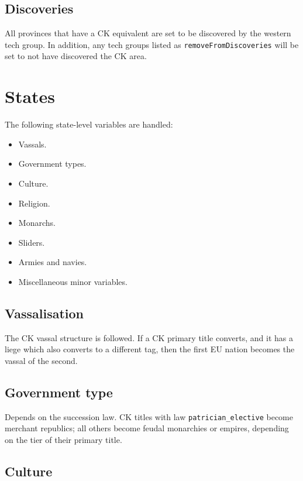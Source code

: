 \documentclass[12pt,ebook,oneside]{book}
\begin{document}
\section{Discoveries}

All provinces that have a CK equivalent are set to be discovered by
the western tech group. In addition, any tech groups listed as
\verb|removeFromDiscoveries| will be set to not have discovered the CK
area. 

\chapter{States}

The following state-level variables are handled:
\begin{itemize}
\item Vassals.
\item Government types. 
\item Culture. 
\item Religion. 
\item Monarchs. 
\item Sliders.
\item Armies and navies. 
\item Miscellaneous minor variables. 
\end{itemize}

\section{Vassalisation}

The CK vassal structure is followed. If a CK primary title converts,
and it has a liege which also converts to a different tag, then the first EU nation
becomes the vassal of the second. 

\section{Government type}

Depends on the succession law. CK titles with law
\verb|patrician_elective| become merchant republics; all others
become feudal monarchies or empires, depending on the tier of their
primary title. 

\section{Culture}
\end{document}
